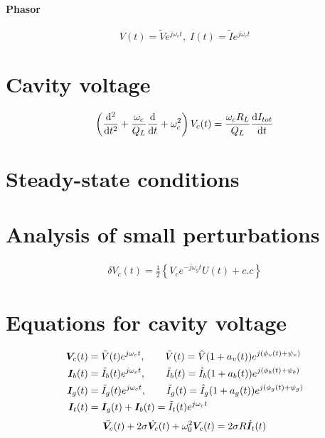 \documentclass[book]{jlreq}
\begin{document}
\paragraph{Phasor}
\begin{equation}
    V(t) = \tilde{V}e^{j\omega_c t}, \; I(t) = \tilde{I}e^{j\omega_c t}
\end{equation}

\section{Cavity voltage}

\begin{equation}
    \left(\dv[2]{t}+\frac{\omega_c}{Q_L}\dv{t}+\omega_c^2\right)V_c(t)=\frac{\omega_c R_L}{Q_L}\dv{I_{tot}}{t}
\end{equation}

\section{Steady-state conditions}

\section{Analysis of small perturbations}

\begin{align}
    \delta V_c(t) = \frac{1}{2}\left\{V_c e^{-j\omega_g t}U(t)+ c.c\right\}
\end{align}


\section{Equations for cavity voltage}
\begin{equation}
    \begin{split}
        \vb*{V}_c(t) &= \tilde{V}(t)e^{j\omega_c t},\qquad \tilde{V}(t) = \hat{V}(1+a_v(t))e^{j(\phi_v(t)+\psi_v)} \\
        \vb*{I}_b(t) &= \tilde{I}_b(t) e^{j\omega_c t},\qquad \tilde{I}_b(t) = \hat{I}_b(1+a_b(t))e^{j(\phi_b(t)+\psi_b)} \\
        \vb*{I}_g(t) &= \tilde{I}_g(t) e^{j\omega_c t},\qquad \tilde{I}_g(t) = \hat{I}_g(1+a_g(t))e^{j(\phi_g(t)+\psi_g)} \\
        \vb*{I}_t(t) &= \vb*{I}_g(t) + \vb*{I}_b(t) = \tilde{I}_t(t) e^{j\omega_c t}
    \end{split}
\end{equation}
%
%
\begin{equation}
    \ddot{\vb*{V}_c}(t) + 2 \sigma \dot{\vb*{V}_c}(t) + \omega_0^2 \vb*{V}_c(t) = 2\sigma R \dot{\vb*{I}}_t(t)
\end{equation}
%
\clearpage
\end{document}
